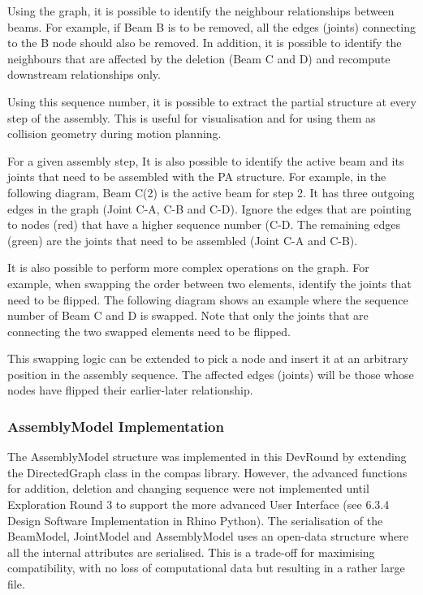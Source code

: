 Using the graph, it is possible to identify the neighbour relationships between beams. For example, if Beam B is to be removed, all the edges (joints) connecting to the B node should also be removed. In addition, it is possible to identify the neighbours that are affected by the deletion (Beam C and D) and recompute downstream relationships only. 

Using this sequence number, it is possible to extract the partial structure at every step of the assembly. This is useful for visualisation and for using them as collision geometry during motion planning.

For a given assembly step, It is also possible to identify the active beam and its joints that need to be assembled with the PA structure. For example, in the following diagram, Beam C(2) is the active beam for step 2. It has three outgoing edges in the graph (Joint C-A, C-B and C-D). Ignore the edges that are pointing to nodes (red) that have a higher sequence number (C-D. The remaining edges (green) are the joints that need to be assembled (Joint C-A and C-B). 

It is also possible to perform more complex operations on the graph. For example, when swapping the order between two elements, identify the joints that need to be flipped. The following diagram shows an example where the sequence number of Beam C and D is swapped. Note that only the joints that are connecting the two swapped elements need to be flipped.

This swapping logic can be extended to pick a node and insert it at an arbitrary position in the assembly sequence.  The affected edges (joints) will be those whose nodes have flipped their earlier-later relationship. 

\subsubsection{AssemblyModel Implementation}
\label{subsubsection:exploration_2_assemblymodel_implementation}

The AssemblyModel structure was implemented in this DevRound by extending the DirectedGraph class in the compas library. However, the advanced functions for addition, deletion and changing sequence were not implemented until Exploration Round 3 to support the more advanced User Interface (see 6.3.4 Design Software Implementation in Rhino Python).
The serialisation of the BeamModel, JointModel and AssemblyModel uses an open-data structure where all the internal attributes are serialised. This is a trade-off for maximising compatibility, with no loss of computational data but resulting in a rather large file. 

